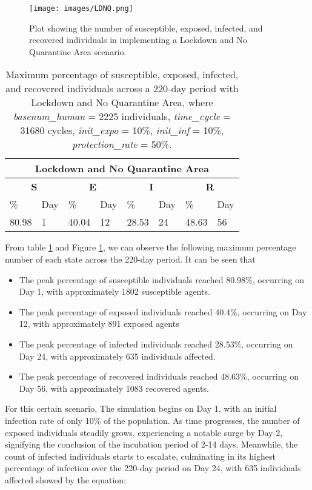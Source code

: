 	\begin{figure}[H]
\centering
\texttt{[image: images/LDNQ.png]}
\caption{Plot showing the number of susceptible, exposed, infected, and recovered individuals in implementing a Lockdown and No Quarantine Area scenario. }
\label{LD2} 
\end{figure}
\begin{table} [H]
\centering
\begin{tabular}{|l|l|l|l|l|l|l|l|}
	\hline
	\multicolumn{8}{|c|}{\textbf{Lockdown and No Quarantine Area}}\\
	\hline
	\multicolumn{2}{|c|}{\textbf{S}} &  \multicolumn{2}{|c|}{\textbf{E}}&  \multicolumn{2}{|c|}{\textbf{I}}&  \multicolumn{2}{|c|}{\textbf{R}}\\
	\hline
	\%& Day & \% & Day & \%  & Day & \% & Day \\
	\hline
	80.98& 1 &40.04& 12&  28.53& 24& 48.63&56\\
	\hline
\end{tabular}
\caption{Maximum percentage of susceptible, exposed, infected, and recovered individuals across a 220-day period with Lockdown and No Quarantine Area, where \textit{basenum\_human} = 2225 individuals, \textit{time\_cycle} = 31680 cycles, \textit{init\_expo} = 10\%, \textit{init\_inf} = 10\%,  \textit{protection\_rate} = 50\%.}
\label{LD2_Max}
\end{table}
From table \ref{LD2_Max} and Figure \ref{LD2}, we can observe the following maximum percentage number of each state across the 220-day period. It can be seen that 

\begin{itemize}

\item The peak percentage of susceptible individuals reached 80.98\%, occurring on Day 1, with approximately 1802 susceptible agents.
\item The peak percentage of exposed individuals reached 40.4\%, occurring on Day 12, with approximately 891 exposed agents
\item The peak percentage of infected individuals reached 28.53\%, occurring on Day 24, with approximately 635 individuals affected.
\item The peak percentage of recovered individuals reached 48.63\%, occurring on Day 56, with approximately 1083 recovered agents. 
\end{itemize}

For this certain scenario, The simulation begins on Day 1, with an initial infection rate of only 10\% of the population. As time progresses, the number of exposed individuals steadily grows, experiencing a notable surge by Day 2, signifying the conclusion of the incubation period of 2-14 days. Meanwhile, the count of infected individuals starts to escalate, culminating in its highest percentage of infection over the 220-day period on Day 24, with 635 individuals affected showed by the equation:


